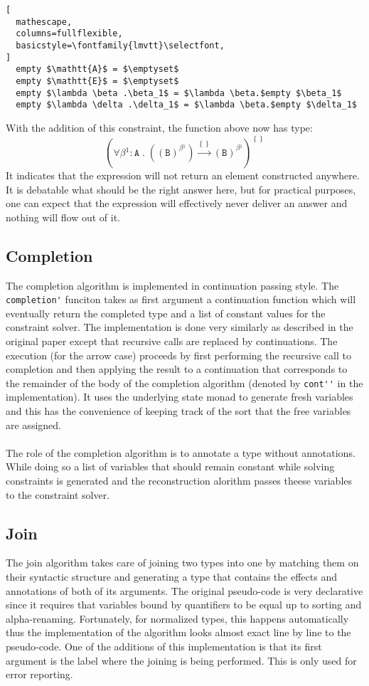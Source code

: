 \documentclass[8pt]{extarticle}
\begin{document}
\begin{lstlisting}[
  mathescape,
  columns=fullflexible,
  basicstyle=\fontfamily{lmvtt}\selectfont,
]
  empty $\mathtt{A}$ = $\emptyset$
  empty $\mathtt{E}$ = $\emptyset$
  empty $\lambda \beta .\beta_1$ = $\lambda \beta.$empty $\beta_1$
  empty $\lambda \delta .\delta_1$ = $\lambda \beta.$empty $\delta_1$
\end{lstlisting}
With the addition of this constraint, the function above now has type:
\[
\left(\forall{}\beta{}^{1}:\mathtt{A}\;{}.\;{}\left(\left(\mathtt{B}\right)^{\beta{}^{1}}\right)\xrightarrow{\left\{\right\}}\left(\mathtt{B}\right)^{\beta{}^{1}}\right)^{\left\{\right\}}
\]
It indicates that the expression will not return an element constructed anywhere. It is debatable what should be the right answer here, but for practical purposes, one can expect that the expression will effectively never deliver an answer and nothing will flow out of it.
\subsection{Completion}
The completion algorithm is implemented in continuation passing style. The \verb+completion'+ funciton takes as first argument a continuation function which will eventually return the completed type and a list of constant values for the constraint solver. The implementation is done very similarly as described in the original paper except that recursive calls are replaced by continuations. The execution (for the arrow case) proceeds by first performing the recursive call to completion and then applying the result to a continuation that corresponds to the remainder of the body of the completion algorithm (denoted by \verb+cont''+ in the implementation). It uses the underlying state monad to generate fresh variables and this has the convenience of keeping track of the sort that the free variables are assigned.
\\\\
The role of the completion algorithm is to annotate a type without annotations. While doing so a list of variables that should remain constant while solving constraints is generated and the reconstruction alorithm passes theese variables to the constraint solver.
\subsection{Join}
The join algorithm takes care of joining two types into one by matching them on their syntactic structure and generating a type that contains the effects and annotations of both of its arguments. The original pseudo-code is very declarative since it requires that variables bound by quantifiers to be equal up to sorting and alpha-renaming. Fortunately, for normalized types, this happens automatically thus the implementation of the algorithm looks almost exact line by line to the pseudo-code. One of the additions of this implementation is that its first argument is the label where the joining is being performed. This is only used for error reporting.
\end{document}
